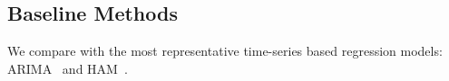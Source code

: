 \subsection{Baseline Methods}
We compare with the most representative time-series based regression models: ARIMA~\cite{ARIMA} and HAM~\cite{Pan2012}. 
%	
	
